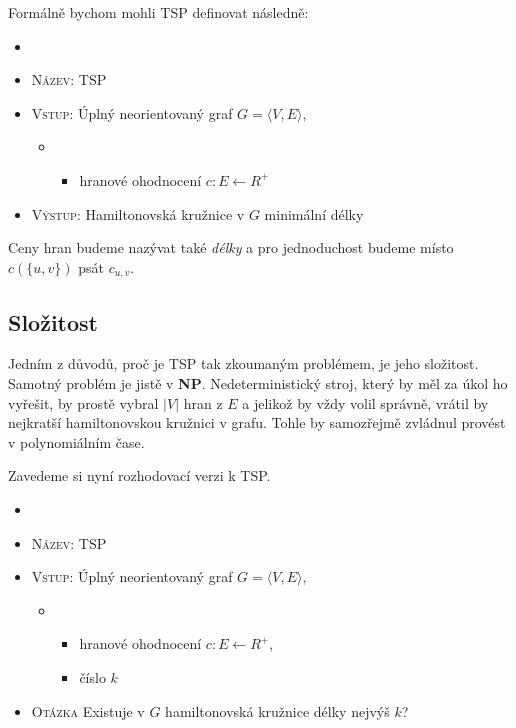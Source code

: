 \documentclass[
  biblatex,
  figures=false,
  glossaries,
  index
]{kidiplom}
\begin{document}
Formálně bychom mohli TSP definovat následně:
\begin{definition}
\begin{itemize}[label={}]
  \item
  \item \textsc{Název}: TSP
  \item \textsc{Vstup}: Úplný neorientovaný graf $G=\langle V, E \rangle$,
  \begin{itemize}[label={}]
  \item \begin{itemize}[label={}]
  \item hranové ohodnocení $c : E \leftarrow R^+$
  \end{itemize}
  \end{itemize}
  \item \textsc{Výstup}: Hamiltonovská kružnice v $G$ minimální délky
\end{itemize}
\end{definition}

Ceny hran budeme nazývat také \textit{délky} a pro jednoduchost budeme místo $c(\{u, v\})$ psát $c_{u, v}$.

\subsection{Složitost}
Jedním z důvodů, proč je TSP tak zkoumaným problémem, je jeho složitost. Samotný problém je jistě v \textbf{NP}. Nedeterministický stroj, který by měl za úkol ho vyřešit, by prostě vybral $|V|$ hran z $E$ a jelikož by vždy volil správně, vrátil by nejkratší hamiltonovskou kružnici v grafu. Tohle by samozřejmě zvládnul provést v  polynomiálním čase.

Zavedeme si nyní rozhodovací verzi k TSP.
\begin{definition}
\begin{itemize}[label={}]
  \item
  \item \textsc{Název}: TSP
  \item \textsc{Vstup}: Úplný neorientovaný graf $G=\langle V, E \rangle$,
  \begin{itemize}[label={}]
  \item \begin{itemize}[label={}]
  \item hranové ohodnocení $c : E \leftarrow R^+$,
  \item číslo $k$
  \end{itemize}
  \end{itemize}
  \item \textsc{Otázka} Existuje v $G$ hamiltonovská kružnice délky nejvýš $k$?
\end{itemize}
\end{definition}
\end{document}
